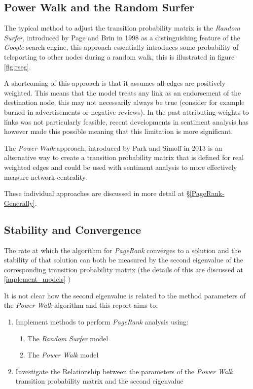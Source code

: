 \documentclass[11pt]{report}
\begin{document}
\subsection{Power Walk and the Random Surfer}
\label{sec:org109f9e7}
The typical method to adjust the transition probability matrix is the \emph{Random
Surfer}, introduced by Page and Brin in 1998
 \cite{larrypageAnatomyLargescaleHypertextual1998} as a distinguishing feature of
the \emph{Google} search engine, this approach essentially introduces some probability
of teleporting to other nodes during a random walk, this is illustrated in
figure \ref{fig:rseg}.

A shortcoming of this approach is that it assumes all edges are positively weighted. This
means that the model treats any link as an endorsement of the destination
node, this may not necessarily always be true (consider for example burned-in
advertisements or negative reviews). In the past attributing weights to links was not particularly feasible, recent developments in sentiment analysis has however made this possible meaning that this limitation is more significant.

The \emph{Power Walk} approach, introduced by Park and Simoff in 2013 \cite{parkPowerWalkRevisiting2013} is an alternative way to create a transition
probability matrix that is defined for real weighted edges and could be used with sentiment analysis to more effectively measure network centrality.

These individual approaches are discussed in more detail at \S \ref{PageRank-Generally}.

\subsection{Stability and Convergence}
\label{sec:orgcefa601}

The rate at which the algorithm for \emph{PageRank} converges to a solution and the stability of that solution can both be measured by the second eigenvalue of the corresponding transition probability matrix (the details of this are discussed at \ref{implement_models} )

It is not clear how the second eigenvalue is related to the method parameters of the \emph{Power Walk} algorithm \cite[]{parkPowerWalkRevisiting2013} and this report aims to:

\begin{enumerate}
\item Implement methods to perform \emph{PageRank} analysis using:
\begin{enumerate}
\item The \emph{Random Surfer} model
\item The \emph{Power Walk} model
\end{enumerate}
\item Investigate the Relationship between the parameters of the \emph{Power Walk}
transition probability matrix and the second eigenvalue
\end{enumerate}
\end{document}
